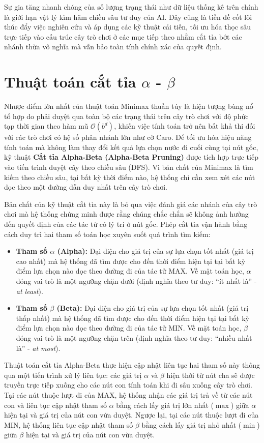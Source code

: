 Sự gia tăng nhanh chóng của số lượng trạng thái như dữ liệu thống kê trên chính là giới hạn vật lý kìm hãm chiều sâu tư duy của AI. Đây cũng là tiền đề cốt lõi thúc đẩy việc nghiên cứu và áp dụng các kỹ thuật cải tiến, tối ưu hóa thọc sâu trực tiếp vào cấu trúc cây trò chơi ở các mục tiếp theo nhằm cắt tỉa bớt các nhánh thừa vô nghĩa mà vẫn bảo toàn tính chính xác của quyết định.
 
\section{Thuật toán cắt tỉa $\alpha$ - $\beta$} 
Nhược điểm lớn nhất của thuật toán Minimax thuần túy là hiện tượng bùng nổ tổ hợp do phải duyệt qua toàn bộ các trạng thái trên cây trò chơi với độ phức tạp thời gian theo hàm mũ $\mathcal{O}(b^d)$, khiến việc tính toán trở nên bất khả thi đối với các trò chơi có hệ số phân nhánh lớn như cờ Caro. Để tối ưu hóa hiệu năng tính toán mà không làm thay đổi kết quả lựa chọn nước đi cuối cùng tại nút gốc, kỹ thuật \textbf{Cắt tỉa Alpha-Beta (Alpha-Beta Pruning)} được tích hợp trực tiếp vào tiến trình duyệt cây theo chiều sâu (DFS). Vì bản chất của Minimax là tìm kiếm theo chiều sâu, tại bất kỳ thời điểm nào, hệ thống chỉ cần xem xét các nút dọc theo một đường dẫn duy nhất trên cây trò chơi. 

Bản chất của kỹ thuật cắt tỉa này là bỏ qua việc đánh giá các nhánh của cây trò chơi mà hệ thống chứng minh được rằng chúng chắc chắn sẽ không ảnh hưởng đến quyết định của các tác tử có lý trí ở nút gốc. Phép cắt tỉa vận hành bằng cách duy trì hai tham số toán học xuyên suốt quá trình tìm kiếm: 
\begin{itemize}
	\item \textbf{Tham số $\alpha$ (Alpha):} Đại diện cho giá trị của sự lựa chọn tốt nhất (giá trị cao nhất) mà hệ thống đã tìm được cho đến thời điểm hiện tại tại bất kỳ điểm lựa chọn nào dọc theo đường đi của tác tử MAX. Về mặt toán học, $\alpha$ đóng vai trò là một ngưỡng chặn dưới (định nghĩa theo tư duy: ``ít nhất là'' - \textit{at least}).
	\item \textbf{Tham số $\beta$ (Beta):} Đại diện cho giá trị của sự lựa chọn tốt nhất (giá trị thấp nhất) mà hệ thống đã tìm được cho đến thời điểm hiện tại tại bất kỳ điểm lựa chọn nào dọc theo đường đi của tác tử MIN. Về mặt toán học, $\beta$ đóng vai trò là một ngưỡng chặn trên (định nghĩa theo tư duy: ``nhiều nhất là'' - \textit{at most}).
\end{itemize}

Thuật toán cắt tỉa Alpha-Beta thực hiện cập nhật liên tục hai tham số này thông qua một tiến trình xử lý liên tục: các giá trị $\alpha$ và $\beta$ hiện thời từ nút cha sẽ được truyền trực tiếp xuống cho các nút con tính toán khi đi sâu xuống cây trò chơi. Tại các nút thuộc lượt đi của MAX, hệ thống nhận các giá trị trả về từ các nút con và liên tục cập nhật tham số $\alpha$ bằng cách lấy giá trị lớn nhất ($\max$) giữa $\alpha$ hiện tại và giá trị của nút con vừa duyệt. Ngược lại, tại các nút thuộc lượt đi của MIN, hệ thống liên tục cập nhật tham số $\beta$ bằng cách lấy giá trị nhỏ nhất ($\min$) giữa $\beta$ hiện tại và giá trị của nút con vừa duyệt.


